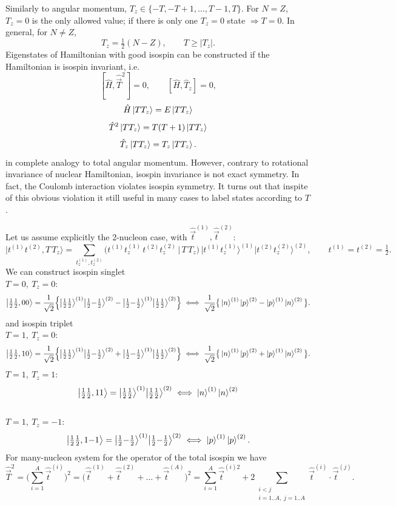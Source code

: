 \documentclass[11pt,a4paper]{article}
\newcommand{\op}[1]{\hat{#1}}
\begin{document}
Similarly to angular momentum, $T_z\in\{-T,-T+1,\dots,T-1,T\}$. For $N=Z$,
$T_z=0$ is the only allowed value; if there is only one $T_z=0$ state $\Rightarrow
T=0$. In general, for $N\ne Z$,
\[
T_z=\tfrac12(N-Z),\qquad T\ge |T_z| .
\]
Eigenstates of Hamiltonian with good isospin can be constructed if the Hamiltonian is isospin invariant, i.e.  
\[
[\op H,\op {\vec T}^2]=0,\qquad [\op H,\op T_z]=0, 
\]
\[
\op H \ket{T T_z} = E \ket{T T_z} 
\]
\[
\op T^2\ket{T T_z}=T(T+1)\ket{T T_z}
\]
\[
\op T_z\ket{T T_z }=T_z\ket{T  T_z}.
\]
in complete analogy to total angular momentum. 
However, contrary to rotational invariance of nuclear Hamiltonian, isospin invariance is not exact symmetry. In fact, the Coulomb interaction violates isospin symmetry. It turns out that inspite of this obvious violation it still useful in many cases to label states according to $T$.
\\
\par 
Let us assume explicitly the 2-nucleon case, with $\op{\vec t}^{(1)},\op{\vec t}^{(2)}$:
\[
\big|t^{(1)}t^{(2)},T\,T_z\big\rangle=
\sum_{t_z^{(1)},t_z^{(2)}}
\big(t^{(1)}t_z^{(1)}\,t^{(2)}t_z^{(2)}\,\big|\,T\,T_z\big)\,
\big|t^{(1)}t_z^{(1)}\big\rangle^{(1)}\big|t^{(2)}t_z^{(2)}\big\rangle^{(2)},
\qquad t^{(1)}=t^{(2)}=\tfrac12 .
\]
We can construct isospin singlet \\
$T=0,\ T_z=0$:
\[
\big|\tfrac12\tfrac12,00\big\rangle
=\frac{1}{\sqrt2}\Big\{\big|\tfrac12\tfrac12\big\rangle^{(1)}\big|\tfrac12{-}\tfrac12\big\rangle^{(2)}
-\big|\tfrac12{-}\tfrac12\big\rangle^{(1)}\big|\tfrac12\tfrac12\big\rangle^{(2)}\Big\}
\;\Longleftrightarrow\;
\frac{1}{\sqrt2}\big\{\ket{n}^{(1)}\ket{p}^{(2)}-\ket{p}^{(1)}\ket{n}^{(2)}\big\}.
\]
and isospin triplet \\
$T=1,\ T_z=0$:
\[
\big|\tfrac12\tfrac12,10\big\rangle
=\frac{1}{\sqrt2}\Big\{\big|\tfrac12\tfrac12\big\rangle^{(1)}\big|\tfrac12{-}\tfrac12\big\rangle^{(2)}
+\big|\tfrac12{-}\tfrac12\big\rangle^{(1)}\big|\tfrac12\tfrac12\big\rangle^{(2)}\Big\}
\;\Longleftrightarrow\;
\frac{1}{\sqrt2}\big\{\ket{n}^{(1)}\ket{p}^{(2)}+\ket{p}^{(1)}\ket{n}^{(2)}\big\}.
\]
$T=1,\ T_z=1$: \\
\[
\big|\tfrac12\tfrac12,11\big\rangle=\big|\tfrac12\tfrac12\big\rangle^{(1)}\big|\tfrac12\tfrac12\big\rangle^{(2)}
\;\Longleftrightarrow\;
\ket n^{(1)}\ket n^{(2)}
\]
\\
$T=1,\ T_z=-1$:\\
\[
\big|\tfrac12\tfrac12,1{-}1\big\rangle=\big|\tfrac12{-}\tfrac12\big\rangle^{(1)}\big|\tfrac12{-}\tfrac12\big\rangle^{(2)}
\;\Longleftrightarrow\; \ket p^{(1)}\ket p^{(2)}.
\]
For many-nucleon system for the operator of the total isospin we have 
\[
\op {\vec T}^2=\Big(\sum_{i=1}^A\op{\vec t}^{(i)}\Big)^2
=\big(\op{\vec t}^{(1)}+\op{\vec t}^{(2)}+\dots+\op{\vec t}^{(A)}\big)^2
=\sum_{i=1}^A \op{\vec t}^{(i)2}+2\!\!\sum_{\substack{i<j\\ i=1..A,\;j=1..A}}\!\!\op{\vec t}^{(i)}\!\cdot\op{\vec t}^{(j)} .
\]
\end{document}
